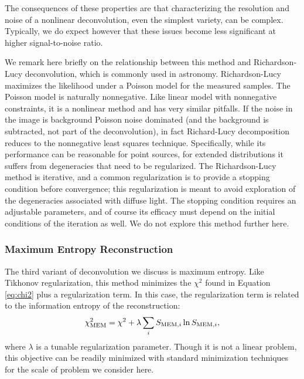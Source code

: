 \documentclass[twocolumn,tighten]{aastex61}
\begin{document}
The consequences of these properties are that characterizing the
resolution and noise of a nonlinear deconvolution, even the simplest
variety, can be complex. Typically, we do expect however that these
issues become less significant at higher signal-to-noise ratio.

We remark here briefly on the relationship between this method and
Richardson-Lucy deconvolution, which is commonly used in astronomy.
Richardson-Lucy maximizes the likelihood under a Poisson model for the
measured samples. The Poisson model is naturally nonnegative. Like
linear model with nonnegative constraints, it is a nonlinear method
and has very similar pitfalls. If the noise in the image is background
Poisson noise dominated (and the background is subtracted, not part of
the deconvolution), in fact Richard-Lucy decomposition reduces to the
nonnegative least squares technique.  Specifically, while its
performance can be reasonable for point sources, for extended
distributions it suffers from degeneracies that need to be
regularized. The Richardson-Lucy method is iterative, and a common
regularization is to provide a stopping condition before convergence;
this regularization is meant to avoid exploration of the degeneracies
associated with diffuse light. The stopping condition requires an
adjustable parameters, and of course its efficacy must depend on the
initial conditions of the iteration as well. We do not explore this
method further here.


\subsubsection{Maximum Entropy Reconstruction}
\label{sec:mem}

The third variant of deconvolution we discuss is maximum entropy. Like
Tikhonov regularization, this method minimizes the $\chi^2$ found in
Equation \ref{eq:chi2} plus a regularization term. In this case, the
regularization term is related to the information entropy of the
reconstruction:
\begin{equation}
\chi^2_{\rm MEM} = \chi^2 + \lambda \sum_i S_{{\rm MEM}, i} \ln S_{{\rm MEM},
  i},
\end{equation}
where $\lambda$ is a tunable regularization parameter. Though it is
not a linear problem, this objective can be readily minimized with
standard minimization techniques for the scale of problem we consider
here.
\end{document}
